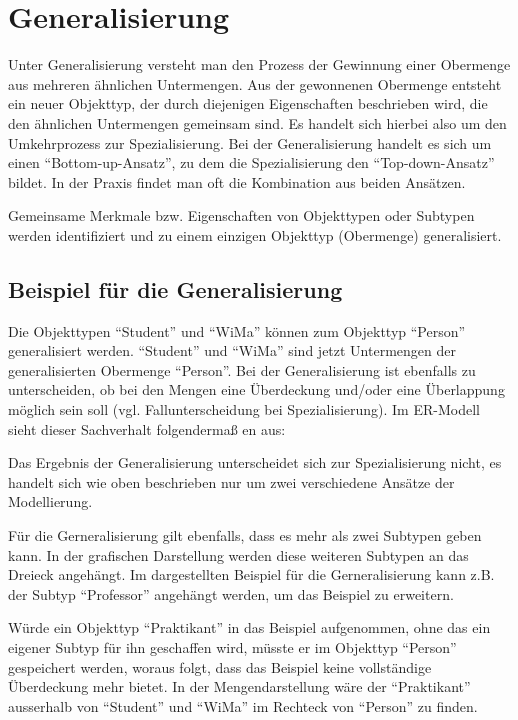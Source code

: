      \section{Generalisierung}
      Unter Generalisierung versteht man den Prozess der Gewinnung einer Obermenge aus mehreren ähnlichen Untermengen. Aus der gewonnenen Obermenge entsteht ein neuer Objekttyp, der durch diejenigen Eigenschaften beschrieben wird, die den ähnlichen Untermengen gemeinsam sind. Es handelt sich hierbei also um den Umkehrprozess zur Spezialisierung. Bei der Generalisierung handelt es sich um einen \enquote{Bottom-up-Ansatz}, zu dem die Spezialisierung den \enquote{Top-down-Ansatz} bildet. In der Praxis findet man oft die Kombination aus beiden Ansätzen.

      Gemeinsame Merkmale bzw. Eigenschaften von Objekttypen oder Subtypen werden identifiziert und zu einem einzigen Objekttyp (Obermenge) generalisiert.
      \subsection{Beispiel für die Generalisierung}
        Die Objekttypen \enquote{Student} und \enquote{WiMa} können zum Objekttyp \enquote{Person} generalisiert werden. \enquote{Student} und \enquote{WiMa} sind jetzt Untermengen der generalisierten Obermenge \enquote{Person}. Bei der Generalisierung ist ebenfalls zu unterscheiden, ob bei den Mengen eine Überdeckung und/oder eine Überlappung möglich sein soll (vgl. Fallunterscheidung bei Spezialisierung). Im ER-Modell sieht dieser Sachverhalt folgendermaß en aus:
        \begin{center}
        \end{center}
        Das Ergebnis der Generalisierung unterscheidet sich zur Spezialisierung nicht, es handelt sich wie oben beschrieben nur um zwei verschiedene Ansätze der Modellierung.

        Für die Gerneralisierung gilt ebenfalls, dass es mehr als zwei Subtypen geben kann. In der grafischen Darstellung werden diese weiteren Subtypen an das Dreieck angehängt. Im dargestellten Beispiel für die Gerneralisierung kann z.B. der Subtyp \enquote{Professor} angehängt werden, um das Beispiel zu erweitern.

        Würde ein Objekttyp \enquote{Praktikant} in das Beispiel aufgenommen, ohne das ein eigener Subtyp für ihn geschaffen wird, müsste er im Objekttyp \enquote{Person} gespeichert werden, woraus folgt, dass das Beispiel keine vollständige Überdeckung mehr bietet. In der Mengendarstellung wäre der \enquote{Praktikant} ausserhalb von \enquote{Student} und \enquote{WiMa} im Rechteck von \enquote{Person} zu finden.
\clearpage
